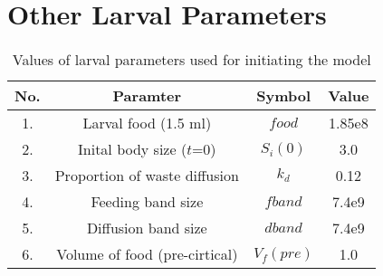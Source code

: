 \section{Other Larval Parameters}
\begin{table}[h!]
  \centering
  \begin{tabular}{|c|c|c|c|}
    \hline
    \textbf{No.} & \textbf{Paramter} & \textbf{Symbol} & \textbf{Value} \\
    \hline
    1. & Larval food (1.5 ml) & $food$ & 1.85e8 \\
    \hline
    2. & Inital body size ($t$=0) & $S_{i}(0)$ & 3.0 \\
    \hline
    3. & Proportion of waste diffusion & $k_{d}$ & 0.12 \\
    \hline
    4. & Feeding band size & $fband$ & 7.4e9 \\
    \hline
    5. & Diffusion band size & $dband$ & 7.4e9 \\
    \hline
    6. & Volume of food (pre-cirtical) & $V_{f}(pre)$ & 1.0 \\
    \hline
  \end{tabular}
  \caption{Values of larval parameters used for initiating the model}
  \label{tab:food_param}
\end{table}
